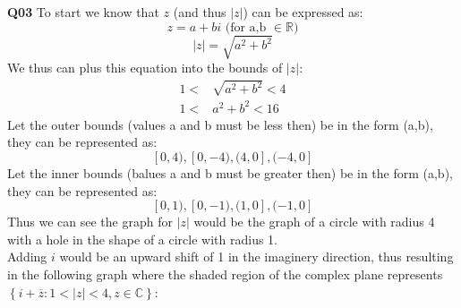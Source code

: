 \documentclass[11pt]{article}
\begin{document}
\parindent=0pt

\textbf{Q03} To start we know that $z$ (and thus $|z|$) can be expressed as:
\[ z = a + bi \text{ (for a,b $\in \mathbb R$)}  \]
\[ |z| = \sqrt{a^2+b^2}  \]
We thus can plus this equation into the bounds of $|z|$:
\begin{align*}
 1 < & \sqrt{a^2+b^2} < 4  \\
 1 < & a^2+b^2 < 16 
\end{align*}
Let the outer bounds (values a and b must be less then) be in the form (a,b), they can be represented as:
\[ [0,4), [0,-4), (4,0], (-4,0] \]
Let the inner bounds (balues a and b must be greater then) be in the form (a,b), they can be represented as:
\[ [0,1), [0,-1), (1,0], (-1,0] \]
Thus we can see the graph for $|z|$ would be the graph of a circle with radius 4 with a hole in the shape of a circle with radius 1. \\
Adding $i$ would be an upward shift of 1 in the imaginery direction, thus resulting in the following graph where the shaded region of the complex plane represents \mbox{$\left\{i + \overline z \colon 1 < |z| < 4, z \in \mathbb C\right\}$}:
\end{document}
